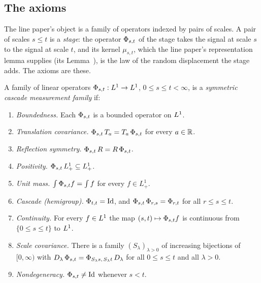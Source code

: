 \subsection{The axioms}\label{sec:axioms-recap}

The line paper's object is a family of operators indexed by pairs of scales. A pair of scales
$s \le t$ is a \emph{stage}: the operator $\Phi_{s,t}$ of the stage takes the signal at scale
$s$ to the signal at scale $t$, and its kernel $\mu_{s,t}$, which the line paper's
representation lemma supplies (its Lemma~), is the
law of the random displacement the stage adds. The axioms are these.

\begin{definition}\label{def:cascade-family}
A family of linear operators $\Phi_{s,t} : L^1 \to L^1$, $0 \le s \le t < \infty$, is a
\emph{symmetric cascade measurement family} if:
\begin{enumerate}
\item[(A1)] \emph{Boundedness.} Each $\Phi_{s,t}$ is a bounded operator on $L^1$.
\item[(A2)] \emph{Translation covariance.} $\Phi_{s,t}\,T_{a} = T_{a}\,\Phi_{s,t}$ for
every $a \in \mathbb{R}$.
\item[(A3)] \emph{Reflection symmetry.} $\Phi_{s,t}\,R = R\,\Phi_{s,t}$.
\item[(A4)] \emph{Positivity.} $\Phi_{s,t}\,L^1_+ \subseteq L^1_+$.
\item[(A5)] \emph{Unit mass.} $\int \Phi_{s,t} f = \int f$ for every $f \in L^1_+$.
\item[(A6)] \emph{Cascade (hemigroup).} $\Phi_{t,t} = \mathrm{Id}$, and
$\Phi_{s,t}\,\Phi_{r,s} = \Phi_{r,t}$ for all $r \le s \le t$.
\item[(A7)] \emph{Continuity.} For every $f \in L^1$ the map $(s,t) \mapsto \Phi_{s,t}f$ is
continuous from $\{0 \le s \le t\}$ to $L^1$.
\item[(A8)] \emph{Scale covariance.} There is a family $(S_\lambda)_{\lambda > 0}$ of
increasing bijections of $[0,\infty)$ with
$D_{\lambda}\,\Phi_{s,t} = \Phi_{S_\lambda s,\,S_\lambda t}\,D_{\lambda}$ for all
$0 \le s \le t$ and all $\lambda > 0$.
\item[(ND)] \emph{Nondegeneracy.} $\Phi_{s,t} \ne \mathrm{Id}$ whenever $s < t$.
\end{enumerate}
\end{definition}

